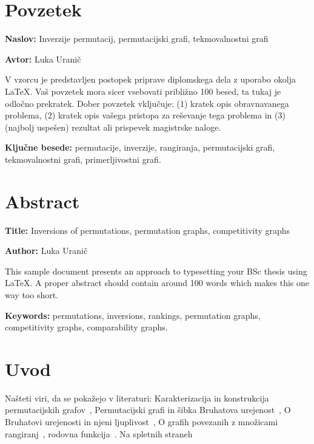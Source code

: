 \documentclass[a4paper, 12pt]{book}
\newcommand{\ttitle}{Inverzije permutacij, permutacijski grafi, tekmovalnostni grafi}
\newcommand{\ttitleEn}{Inversions of permutations, permutation graphs, competitivity graphs}
\newcommand{\tauthor}{Luka Uranič}
\newcommand{\tkeywords}{permutacije, inverzije, rangiranja, permutacijski grafi, tekmovalnostni grafi, primerljivostni grafi}
\newcommand{\tkeywordsEn}{permutations, inversions, rankings, permutation graphs, competitivity graphs, comparability graphs}
\newcommand{\clearemptydoublepage}{\newpage{\pagestyle{empty}\cleardoublepage}}
\begin{document}

\chapter*{Povzetek}

\noindent\textbf{Naslov:} \ttitle
\bigskip

\noindent\textbf{Avtor:} \tauthor
\bigskip

\noindent V vzorcu je predstavljen postopek priprave diplomskega dela z uporabo okolja \LaTeX. Vaš povzetek mora sicer vsebovati približno 100 besed, ta tukaj je odločno prekratek.
Dober povzetek vključuje: (1) kratek opis obravnavanega problema, (2) kratek opis vašega pristopa za reševanje tega problema in (3) (najbolj uspešen) rezultat ali prispevek magistrske naloge.

\bigskip

\noindent\textbf{Ključne besede:} \tkeywords.
\clearemptydoublepage

\chapter*{Abstract}

\noindent\textbf{Title:} \ttitleEn
\bigskip

\noindent\textbf{Author:} \tauthor
\bigskip

\noindent This sample document presents an approach to typesetting your BSc thesis using \LaTeX. 
A proper abstract should contain around 100 words which makes this one way too short.
\bigskip

\noindent\textbf{Keywords:} \tkeywordsEn.
\clearemptydoublepage

\mainmatter
\setcounter{page}{1}
\pagestyle{fancy}

\chapter {Uvod}
Našteti viri, da se pokažejo v literaturi:
 Karakterizacija in konstrukcija permutacijskih grafov~\cite{charectarizationPermutationGraphs}, Permutacijski grafi in šibka Bruhatova urejenost~\cite{weakBruhatOrder}, O Bruhatovi urejenosti in njeni ljuplivost~\cite{bruhatOrder}, O grafih povezanih z množicami rangiranj~\cite{setsOfRankings}, rodovna funkcija~\cite{generatingFunction}. Na spletnih straneh ~\cite{permutation}~\cite{inversion}~\cite{permutationGraph}~\cite{permutationGroup}~\cite{factorialNumberSystem}
\end{document}

